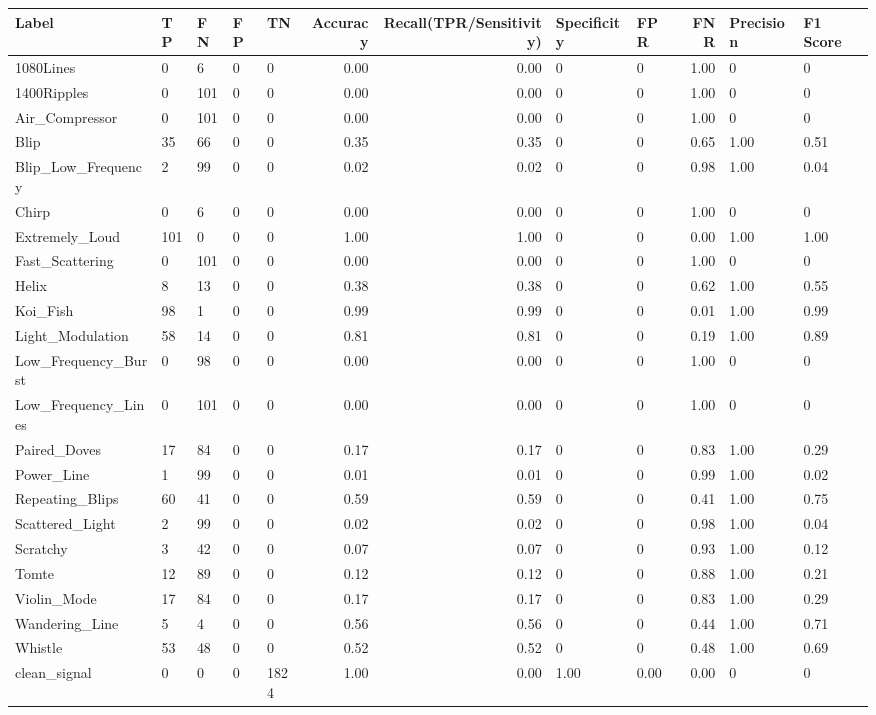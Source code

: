 \begin{tabular}{lllllrrllrll}
\toprule
Label & TP & FN & FP & TN & Accuracy & Recall(TPR/Sensitivity) & Specificity & FPR & FNR & Precision & F1 Score \\
\midrule
1080Lines & 0 & 6 & 0 & 0 & 0.00 & 0.00 & 0 & 0 & 1.00 & 0 & 0 \\
1400Ripples & 0 & 101 & 0 & 0 & 0.00 & 0.00 & 0 & 0 & 1.00 & 0 & 0 \\
Air_Compressor & 0 & 101 & 0 & 0 & 0.00 & 0.00 & 0 & 0 & 1.00 & 0 & 0 \\
Blip & 35 & 66 & 0 & 0 & 0.35 & 0.35 & 0 & 0 & 0.65 & 1.00 & 0.51 \\
Blip_Low_Frequency & 2 & 99 & 0 & 0 & 0.02 & 0.02 & 0 & 0 & 0.98 & 1.00 & 0.04 \\
Chirp & 0 & 6 & 0 & 0 & 0.00 & 0.00 & 0 & 0 & 1.00 & 0 & 0 \\
Extremely_Loud & 101 & 0 & 0 & 0 & 1.00 & 1.00 & 0 & 0 & 0.00 & 1.00 & 1.00 \\
Fast_Scattering & 0 & 101 & 0 & 0 & 0.00 & 0.00 & 0 & 0 & 1.00 & 0 & 0 \\
Helix & 8 & 13 & 0 & 0 & 0.38 & 0.38 & 0 & 0 & 0.62 & 1.00 & 0.55 \\
Koi_Fish & 98 & 1 & 0 & 0 & 0.99 & 0.99 & 0 & 0 & 0.01 & 1.00 & 0.99 \\
Light_Modulation & 58 & 14 & 0 & 0 & 0.81 & 0.81 & 0 & 0 & 0.19 & 1.00 & 0.89 \\
Low_Frequency_Burst & 0 & 98 & 0 & 0 & 0.00 & 0.00 & 0 & 0 & 1.00 & 0 & 0 \\
Low_Frequency_Lines & 0 & 101 & 0 & 0 & 0.00 & 0.00 & 0 & 0 & 1.00 & 0 & 0 \\
Paired_Doves & 17 & 84 & 0 & 0 & 0.17 & 0.17 & 0 & 0 & 0.83 & 1.00 & 0.29 \\
Power_Line & 1 & 99 & 0 & 0 & 0.01 & 0.01 & 0 & 0 & 0.99 & 1.00 & 0.02 \\
Repeating_Blips & 60 & 41 & 0 & 0 & 0.59 & 0.59 & 0 & 0 & 0.41 & 1.00 & 0.75 \\
Scattered_Light & 2 & 99 & 0 & 0 & 0.02 & 0.02 & 0 & 0 & 0.98 & 1.00 & 0.04 \\
Scratchy & 3 & 42 & 0 & 0 & 0.07 & 0.07 & 0 & 0 & 0.93 & 1.00 & 0.12 \\
Tomte & 12 & 89 & 0 & 0 & 0.12 & 0.12 & 0 & 0 & 0.88 & 1.00 & 0.21 \\
Violin_Mode & 17 & 84 & 0 & 0 & 0.17 & 0.17 & 0 & 0 & 0.83 & 1.00 & 0.29 \\
Wandering_Line & 5 & 4 & 0 & 0 & 0.56 & 0.56 & 0 & 0 & 0.44 & 1.00 & 0.71 \\
Whistle & 53 & 48 & 0 & 0 & 0.52 & 0.52 & 0 & 0 & 0.48 & 1.00 & 0.69 \\
clean_signal & 0 & 0 & 0 & 1824 & 1.00 & 0.00 & 1.00 & 0.00 & 0.00 & 0 & 0 \\
\bottomrule
\end{tabular}
